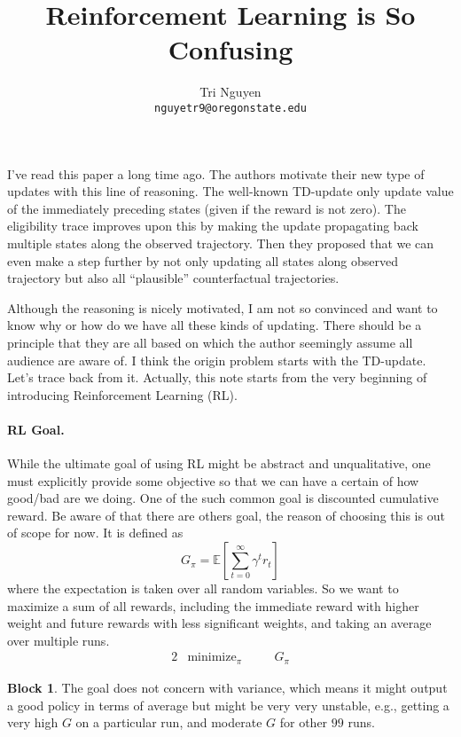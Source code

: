 \documentclass[11pt,a4paper]{article}
\title{Reinforcement Learning is So Confusing}
\author{	Tri Nguyen \\
        \texttt{nguyetr9@oregonstate.edu} \\
        }
\DeclareMathOperator*{\minimize}{minimize}
\theoremstyle{definition}
\newcounter{block_counter}
\newtheorem{blockx}[block_counter]{Block}
\newenvironment{block}
  {\begin{shaded}\begin{blockx}}
  {\end{blockx}\end{shaded}}
\theoremstyle{remark}
\begin{document}
\maketitle

I've read this paper \parencite{madjiheurem2021expected} a long time ago. The authors motivate their new type of updates with this line of reasoning. The well-known TD-update only update value of the immediately preceding states (given if the reward is not zero). The eligibility trace improves upon this by making the update propagating back multiple states along the observed trajectory. Then they proposed that we can even make a step further by not only updating all states along observed trajectory but also all ``plausible'' counterfactual trajectories.

Although the reasoning is nicely motivated, I am not so convinced and want to know why or how do we have all these kinds of updating. There should be a principle that they are all based on which the author seemingly assume all audience are aware of. I think the origin problem starts with the TD-update. Let's trace back from it. Actually, this note starts from the very beginning of introducing Reinforcement Learning (RL).

\paragraph{RL Goal.} 
While the ultimate goal of using RL might be abstract and unqualitative, one must explicitly provide some objective so that we can have a certain of how good/bad are we doing. One of the such common goal is discounted cumulative reward. Be aware of that there are others goal, the reason of choosing this is out of scope for now. It is defined as
\[
G_{\pi} = \mathbb{E} \left[   \sum^{\infty}_{t=0} \gamma^{t} r_t\right]
\] 
where the expectation is taken over all random variables. So we want to maximize a sum of all rewards, including the immediate reward with higher weight and future rewards with less significant weights, and taking an average over multiple runs.
\begin{alignat*}{2}
    & \minimize_{\pi} \quad &&  G_\pi
\end{alignat*}
\begin{block}
The goal does not concern with variance, which means it might output a good policy in terms of average but might be very very unstable, e.g., getting a very high $G$ on a particular run, and moderate $G$ for other $99$ runs.
\end{block}
\end{document}
